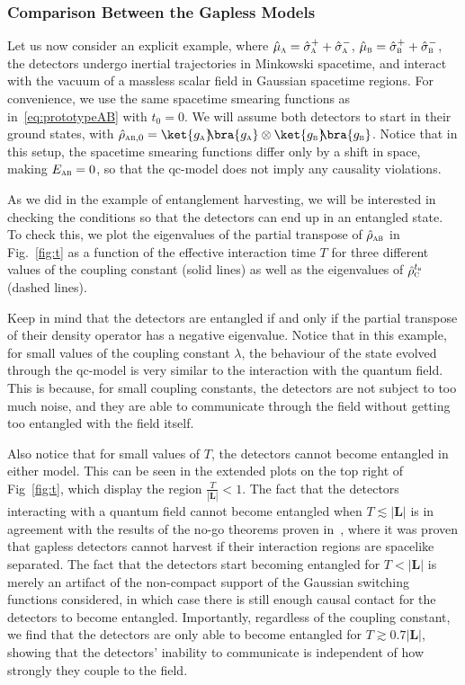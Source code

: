 \documentclass[letterpaper,12pt,titlepage,oneside,final]{book}
\newcommand{\tc}[1]{\textsc{#1}}
\begin{document}
\subsubsection*{Comparison Between the Gapless Models}

Let us now consider an explicit example, where $\hat{\mu}_\tc{a} = \hat{\sigma}_\tc{a}^+ + \hat{\sigma}_\tc{a}^-$, $\hat{\mu}_\tc{b} = \hat{\sigma}_\tc{b}^+ + \hat{\sigma}_\tc{b}^-$, the detectors undergo inertial trajectories in Minkowski spacetime, and interact with the vacuum of a massless scalar field in Gaussian spacetime regions. For convenience, we use the same spacetime smearing functions as in~\eqref{eq:prototypeAB} with $t_0 = 0$. We will assume both detectors to start in their ground states, with \mbox{$\hat{\rho}_{\tc{ab},0} = \ket{g_\tc{a}}\!\!\bra{g_\tc{a}}\otimes \ket{g_\tc{b}}\!\!\bra{g_\tc{b}}$}. Notice that in this setup, the spacetime smearing functions differ only by a shift in space, making $E_{\tc{ab}} = 0$, so that the qc-model does not imply any causality violations.

As we did in the example of entanglement harvesting, we will be interested in checking the conditions so that the detectors can end up in an entangled state. To check this, we plot the eigenvalues of the partial transpose of $\hat{\rho}_{\tc{ab}}$ in Fig.~\ref{fig:t} as a function of the effective interaction time $T$ for three different values of the coupling constant (solid lines) as well as the eigenvalues of $\hat{\rho}_{\tc{c}}^{t_\tc{b}}$ (dashed lines).

Keep in mind that the detectors are entangled if and only if the partial transpose of their density operator has a negative eigenvalue. Notice that in this example, for small values of the coupling constant $\lambda$, the behaviour of the state evolved through the qc-model is very similar to the interaction with the quantum field. This is because, for small coupling constants, the detectors are not subject to too much noise, and they are able to communicate through the field without getting too entangled with the field itself. 


Also notice that for small values of $T$, the detectors cannot become entangled in either model. This can be seen in the extended plots on the top right of Fig~\ref{fig:t}, which display the region $\frac{T}{|\bm L|} < 1$. The fact that the detectors interacting with a quantum field cannot become entangled when $T\lesssim |\bm L|$ is in agreement with the results of the no-go theorems proven in~\cite{HarvestingQueNemLouko,nogo}, where it was proven that gapless detectors cannot harvest if their interaction regions are spacelike separated. The fact that the detectors start becoming entangled for $T  <|\bm L|$ is merely an artifact of the non-compact support of the Gaussian switching functions considered, in which case there is still enough causal contact for the detectors to become entangled. Importantly, regardless of the coupling constant, we find that the detectors are only able to become entangled for $T \gtrsim 0.7 |\bm L|$, showing that the detectors' inability to communicate is independent of how strongly they couple to the field.
\end{document}
